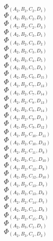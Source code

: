 \documentclass[14pt]{article}
\begin{document}
    $\Phi_{({A}_{2}, {B}_{2}, {C}_{2}, {D}_{1})}$ \\ 
    $\Phi_{({A}_{2}, {B}_{2}, {C}_{2}, {D}_{2})}$ \\ 
    $\Phi_{({A}_{2}, {B}_{2}, {C}_{2}, {D}_{3})}$ \\ 
    $\Phi_{({A}_{2}, {B}_{2}, {C}_{3}, {D}_{1})}$ \\ 
    $\Phi_{({A}_{2}, {B}_{2}, {C}_{3}, {D}_{2})}$ \\ 
    $\Phi_{({A}_{2}, {B}_{2}, {C}_{3}, {D}_{3})}$ \\ 
    $\Phi_{({A}_{2}, {B}_{2}, {C}_{4}, {D}_{5})}$ \\ 
    $\Phi_{({A}_{2}, {B}_{2}, {C}_{5}, {D}_{4})}$ \\ 
    $\Phi_{({A}_{2}, {B}_{2}, {C}_{6}, {D}_{15})}$ \\ 
    $\Phi_{({A}_{2}, {B}_{2}, {C}_{7}, {D}_{13})}$ \\ 
    $\Phi_{({A}_{2}, {B}_{2}, {C}_{7}, {D}_{14})}$ \\ 
    $\Phi_{({A}_{2}, {B}_{2}, {C}_{8}, {D}_{13})}$ \\ 
    $\Phi_{({A}_{2}, {B}_{2}, {C}_{8}, {D}_{14})}$ \\ 
    $\Phi_{({A}_{2}, {B}_{2}, {C}_{9}, {D}_{11})}$ \\ 
    $\Phi_{({A}_{2}, {B}_{2}, {C}_{9}, {D}_{12})}$ \\ 
    $\Phi_{({A}_{2}, {B}_{2}, {C}_{10}, {D}_{11})}$ \\ 
    $\Phi_{({A}_{2}, {B}_{2}, {C}_{10}, {D}_{12})}$ \\ 
    $\Phi_{({A}_{2}, {B}_{2}, {C}_{11}, {D}_{9})}$ \\ 
    $\Phi_{({A}_{2}, {B}_{2}, {C}_{11}, {D}_{10})}$ \\ 
    $\Phi_{({A}_{2}, {B}_{2}, {C}_{12}, {D}_{9})}$ \\ 
    $\Phi_{({A}_{2}, {B}_{2}, {C}_{12}, {D}_{10})}$ \\ 
    $\Phi_{({A}_{2}, {B}_{2}, {C}_{13}, {D}_{7})}$ \\ 
    $\Phi_{({A}_{2}, {B}_{2}, {C}_{13}, {D}_{8})}$ \\ 
    $\Phi_{({A}_{2}, {B}_{2}, {C}_{14}, {D}_{7})}$ \\ 
    $\Phi_{({A}_{2}, {B}_{2}, {C}_{14}, {D}_{8})}$ \\ 
    $\Phi_{({A}_{2}, {B}_{2}, {C}_{15}, {D}_{6})}$ \\ 
    $\Phi_{({A}_{2}, {B}_{3}, {C}_{1}, {D}_{1})}$ \\ 
    $\Phi_{({A}_{2}, {B}_{3}, {C}_{1}, {D}_{2})}$ \\ 
\end{document}
